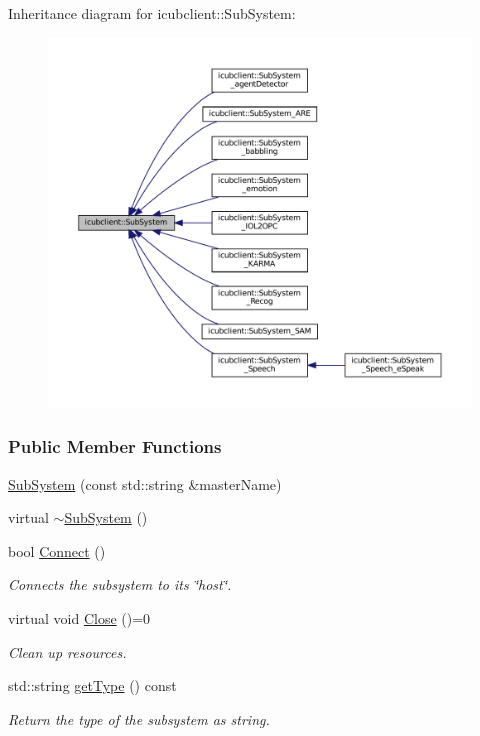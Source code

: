 Inheritance diagram for icubclient\+:\+:Sub\+System\+:
\nopagebreak
\begin{figure}[H]
\begin{center}
\leavevmode
\includegraphics[width=350pt]{classicubclient_1_1SubSystem__inherit__graph}
\end{center}
\end{figure}
\subsubsection*{Public Member Functions}
\begin{DoxyCompactItemize}
\item 
\hyperlink{group__icubclient__subsystems_a63bf4e6d5805ab7d3f3b209219543477}{Sub\+System} (const std\+::string \&master\+Name)
\item 
virtual \hyperlink{group__icubclient__subsystems_aa0f79f798567683b2941858c53959cae}{$\sim$\+Sub\+System} ()
\item 
bool \hyperlink{group__icubclient__subsystems_ab0a8208f6d5d178fc3e9931e122c1a87}{Connect} ()
\begin{DoxyCompactList}\small\item\em Connects the subsystem to its \char`\"{}host\char`\"{}. \end{DoxyCompactList}\item 
virtual void \hyperlink{group__icubclient__subsystems_af327c56ad0d33aada77f825d96fb47f2}{Close} ()=0
\begin{DoxyCompactList}\small\item\em Clean up resources. \end{DoxyCompactList}\item 
std\+::string \hyperlink{group__icubclient__subsystems_abdfadf6419f27b88ebc862d41568a896}{get\+Type} () const
\begin{DoxyCompactList}\small\item\em Return the type of the subsystem as string. \end{DoxyCompactList}\end{DoxyCompactItemize}
